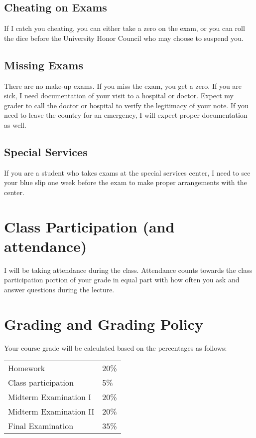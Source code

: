 \documentclass[12pt]{article}
\begin{document}
\subsection*{Cheating on Exams}

If I catch you cheating, you can either take a zero on the exam, or you can roll the dice before the University Honor Council who may choose to suspend you.


\subsection*{Missing Exams}

There are no make-up exams. If you miss the exam, you get a zero. If you are sick, I need documentation of your visit to a hospital or doctor. Expect my grader to call the doctor or hospital to verify the legitimacy of your note. If you need to leave the country for an emergency, I will expect proper documentation as well.

\subsection*{Special Services}

If you are a student who takes exams at the special services center, I need to see your blue slip one week before the exam to make proper arrangements with the center.

\section*{Class Participation (and attendance)}

I will be taking attendance during the class. Attendance counts towards the class participation portion of your grade in equal part with how often you ask and answer questions during the lecture.


\section*{Grading and Grading Policy}

Your course grade will be calculated based on the percentages as follows: 

\begin{table}[h]
\centering
\begin{tabular}{l|l}
Homework & 20\% \\
Class participation & 5\% \\
Midterm Examination I & 20\%\\
Midterm Examination II & 20\%\\
Final Examination & 35\%
\end{tabular}
\end{table}
\FloatBarrier
\end{document}
